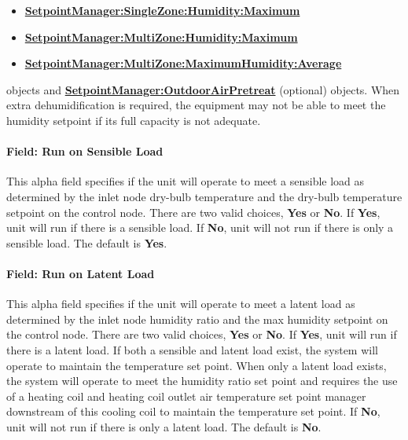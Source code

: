 \begin{itemize}
\item
  \textbf{\hyperref[setpointmanagersinglezonehumiditymaximum]{SetpointManager:SingleZone:Humidity:Maximum}}
\item
  \textbf{\hyperref[setpointmanagermultizonehumiditymaximum]{SetpointManager:MultiZone:Humidity:Maximum}}
\item
  \textbf{\hyperref[setpointmanagermultizonemaximumhumidityaverage]{SetpointManager:MultiZone:MaximumHumidity:Average}}
\end{itemize}

objects and \textbf{\hyperref[setpointmanageroutdoorairpretreat]{SetpointManager:OutdoorAirPretreat}} (optional) objects. When extra dehumidification is required, the equipment may not be able to meet the humidity setpoint if its full capacity is not adequate.

\paragraph{Field: Run on Sensible Load}\label{field-run-on-sensible-load}

This alpha field specifies if the unit will operate to meet a sensible load as determined by the inlet node dry-bulb temperature and the dry-bulb temperature setpoint on the control node. There are two valid choices, \textbf{Yes} or \textbf{No}. If \textbf{Yes}, unit will run if there is a sensible load. If \textbf{No}, unit will not run if there is only a sensible load. The default is \textbf{Yes}.

\paragraph{Field: Run on Latent Load}\label{field-run-on-latent-load}

This alpha field specifies if the unit will operate to meet a latent load as determined by the inlet node humidity ratio and the max humidity setpoint on the control node. There are two valid choices, \textbf{Yes} or \textbf{No}. If \textbf{Yes}, unit will run if there is a latent load. If both a sensible and latent load exist, the system will operate to maintain the temperature set point. When only a latent load exists, the system will operate to meet the humidity ratio set point and requires the use of a heating coil and heating coil outlet air temperature set point manager downstream of this cooling coil to maintain the temperature set point. If \textbf{No}, unit will not run if there is only a latent load. The default is \textbf{No}.


